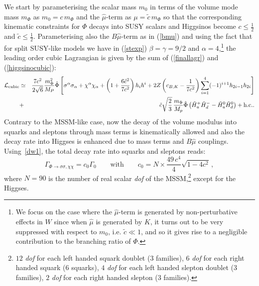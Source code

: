 \documentclass[11pt,a4paper]{article}
\newcommand{\bea}{\begin{eqnarray}}
\newcommand{\eea}{\end{eqnarray}}
\newcommand{\be}{\begin{equation}}
\newcommand{\ee}{\end{equation}}
\def\nn{\nonumber}
\newcommand{\mc}{\mathcal}
\begin{document}
We start by parameterising the scalar mass $m_0$ in terms of the volume mode mass $m_\Phi$ as $m_0 = c \,m_\Phi$ and the $\hat\mu$-term as $\mu = \tilde{c}\,m_\Phi$ so that the corresponding kinematic constraints for $\Phi$ decays into SUSY scalars and Higgsinos become $c \leq \frac 12$ and $\tilde{c}\leq \frac 12$.
Parameterising also the $B\hat\mu$-term as in (\ref{bmu}) and using the fact that for split SUSY-like models we have in (\ref{stexp}) $\beta = \gamma = 9/2$ and $\alpha = 4$,\footnote{We focus on the case where the $\hat\mu$-term is generated by non-perturbative effects in $W$ since when $\hat\mu$ is generated by $K$, it turns out to be very suppressed with respect to $m_0$, i.e. $\tilde{c}\ll 1$, and so it gives rise to a negligible contribution to the branching ratio of $\Phi$.} the leading order cubic Lagrangian is given by the sum of (\ref{finallagr}) and (\ref{higgsinocubic}):
\bea
\mc{L}_{\rm cubic} &\simeq& \frac{7 c^2}{2\sqrt{6}}\frac{m_\Phi^2}{M_P} \hat\Phi\left[  
\sigma^\alpha\sigma_\alpha + \chi^\alpha\chi_\alpha+\left(1+\frac{6\tilde{c}^2}{7 c^2}\right)h_i h^i+ 2Z  \left(c_{B,K}  - \frac{1}{7 c^2} \right) \sum_{i=1}^4 (-1)^{i+1}h_{2i-1}h_{2i}\right] \nn \\
&+& \tilde{c}\sqrt{\frac 23} \, \frac{m_\Phi}{M_p}\hat\Phi \left(\tilde{H}_u^+\tilde{H}_d^- -\tilde{H}_u^0\tilde{H}_d^0\right)+\text{h.c.}.
\label{intlagr}
\eea
Contrary to the MSSM-like case, now the decay of the volume modulus into squarks and sleptons through mass terms is kinematically allowed and also the decay rate into Higgses is enhanced due to mass terms and $B\hat\mu$ couplings. Using~\eqref{dw1}, the total decay rate into squarks and sleptons reads:
\be
\Gamma_{\Phi \rightarrow \sigma\sigma,\chi\chi} = c_0 \Gamma_0\qquad\text{with}\qquad c_0 = N\times \frac{49 \, c^4}{4} \sqrt{1 - 4 c^2}\,, 
\ee
where $N=90$ is the number of real scalar \textit{dof} of the MSSM,\footnote{$12$ \textit{dof} for each left handed squark doublet ($3$ families), $6$ \textit{dof} for each right handed squark ($6$ squarks), $4$ \textit{dof} for each left handed slepton doublet ($3$ families), $2$ \textit{dof} for each right handed slepton ($3$ families).} except for the Higgses.
\end{document}
